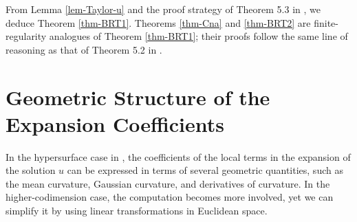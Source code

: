 \documentclass[11pt,reqno]{amsart}
\theoremstyle{definition}
\numberwithin{equation}{section}
\begin{document}
From Lemma \ref{lem-Taylor-u} and the proof strategy of Theorem 5.3 in \cite{HanJiang2023}, we deduce Theorem \ref{thm-BRT1}. Theorems \ref{thm-Cna} and \ref{thm-BRT2} are finite-regularity analogues of Theorem \ref{thm-BRT1}; their proofs follow the same line of reasoning as that of Theorem 5.2 in \cite{HanJiang2023}.


\section{Geometric Structure of the Expansion Coefficients}\label{sec-coeff}
In the hypersurface case in \cite{HanJiang2023}, the coefficients of the local terms in the expansion of the solution $u$ can be expressed in terms of several geometric quantities, such as the mean curvature, Gaussian curvature, and derivatives of curvature. In the higher-codimension case, the computation becomes more involved, yet we can simplify it by using linear transformations in Euclidean space.
\end{document}
